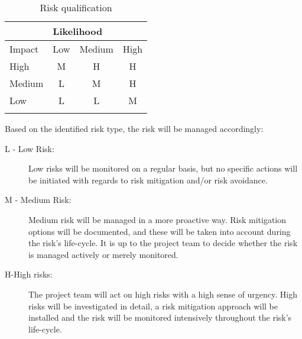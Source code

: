 \begin{longtable}{|l|c|c|c|}
\hline
       & \multicolumn{3}{l|}{Likelihood}                                                     \\ \hline
Impact & Low                       & Medium                      & High                      \\ \hline
High   & \cellcolor[HTML]{FFCB2F}M & \cellcolor[HTML]{FE0000}H   & \cellcolor[HTML]{FE0000}H \\ \hline
Medium & \cellcolor[HTML]{34FF34}L & \cellcolor[HTML]{FFCB2F}M   & \cellcolor[HTML]{FE0000}H \\ \hline
Low    & \cellcolor[HTML]{34FF34}L & \cellcolor[HTML]{34FF34}L   & \cellcolor[HTML]{FFC702}M \\ \hline
\caption{Risk qualification}
\label{tab:risk-qualification}
\end{longtable}

\noindent
Based on the identified risk type, the risk will be managed accordingly:
\begin{description}
	\item [L - Low Risk:]
	Low risks will be monitored on a regular basis, but no specific actions will be initiated with regards to risk mitigation and/or risk avoidance.
	\item [M - Medium Risk:]
	Medium risk will be managed in a more proactive way.
	Risk mitigation options will be documented, and these will be taken into account during the risk's life-cycle.
	It is up to the project team to decide whether the risk is managed actively or merely monitored.
	\item[H-High risks:]
	The project team will act on high risks with a high sense of urgency.
	High risks will be investigated in detail, a risk mitigation approach will be installed and the risk will be monitored intensively throughout the risk's life-cycle.
\end {description}

